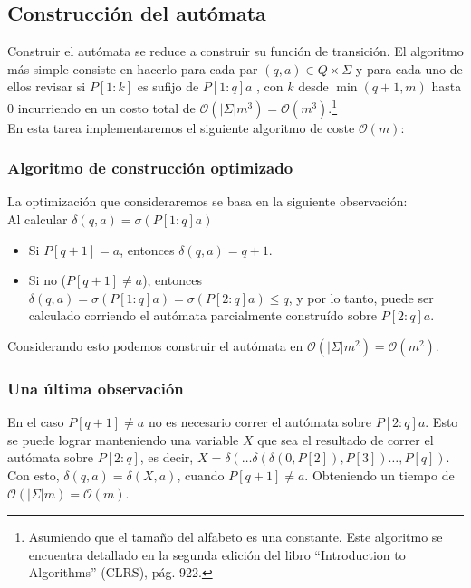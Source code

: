 \documentclass[dcc,uchile]{fcfmcourse}
\begin{document}
\subsection*{Construcción del autómata}
Construir el autómata se reduce a construir su función de transición. El algoritmo más simple consiste en hacerlo para cada par $(q, a)\in Q \times \Sigma$ y para cada uno de ellos revisar si $P[1:k]$ es sufijo de $P[1:q]a$ , con $k$ desde $\min(q+1, m)$ hasta $0$ incurriendo en un costo total de $\mathcal{O}(|\Sigma|m^3) = \mathcal{O}(m^3)$.\footnote{Asumiendo que el tamaño del alfabeto es una constante. Este algoritmo se encuentra detallado en la segunda edición del libro ``Introduction to Algorithms'' (CLRS), pág. 922.} \\En esta tarea implementaremos el siguiente algoritmo de coste $\mathcal{O}(m)$:
\subsubsection*{Algoritmo de construcción optimizado}
La optimización que consideraremos se basa en la siguiente observación:\\

Al calcular $\delta(q,a) = \sigma(P[1:q]a)$
    \begin{itemize}
        \item Si $P[q+1] = a$, entonces $\delta(q,a) = q+1$.
        \item Si no ($P[q+1] \not= a$), entonces $\delta(q,a) = \sigma(P[1:q]a) = \sigma(P[2:q]a) \le q$, y por lo tanto, puede ser calculado corriendo el autómata parcialmente construído sobre $P[2:q]a$.
    \end{itemize}
    Considerando esto podemos construir el autómata en $\mathcal{O}(|\Sigma|m^2) = \mathcal{O}(m^2)$.
\subsubsection*{Una última observación}
En el caso $P[q+1] \not= a$ no es necesario correr el autómata sobre $P[2:q]a$. Esto se puede lograr manteniendo una variable $X$ que sea el resultado de correr el autómata sobre $P[2:q]$, es decir, $X = \delta(\ldots\delta(\delta(0, P[2]), P[3])\ldots , P[q])$. Con esto, $\delta(q, a) = \delta(X, a)$, cuando $P[q+1] \not= a$. Obteniendo un tiempo de $\mathcal{O}(|\Sigma|m) = \mathcal{O}(m)$.
\end{document}
